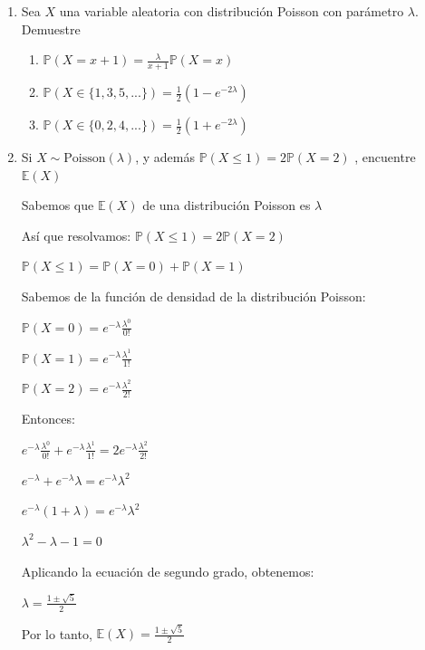 \documentclass[11pt,a4paper]{report}
\begin{document}
\begin{enumerate}
		\item{
		Sea $X$ una variable aleatoria con distribución Poisson con parámetro
		$\lambda$. Demuestre
			\begin{enumerate}
				\item {
					$\mathbb{P}(X = x + 1) = \frac{\lambda}{x + 1}
					 \mathbb{P}(X = x)$
				}

				\item {
					$\mathbb{P}(X \in \{ 1,3,5,...\}) = \frac{1}{2}
					 (1 - e^{-2\lambda})$
				}

				\item {
					$\mathbb{P}(X \in \{ 0,2,4,...\}) = \frac{1}{2}
					 (1 + e^{-2\lambda})$
				}
			\end{enumerate}
		}

		\item{
			Si $X \sim \text{Poisson}(\lambda)$, y además $\mathbb{P}(X \leq 1)
			= 2\mathbb{P}(X = 2)$ , encuentre $\mathbb{E}(X)$
			
			Sabemos que $\mathbb{E}(X)$ de una distribución Poisson es $\lambda$
			
			Así que resolvamos: $\mathbb{P}(X \leq 1) = 2\mathbb{P}(X = 2)$
			
			$\mathbb{P}(X \leq 1) = \mathbb{P}(X = 0) + \mathbb{P}(X = 1)$
			
			Sabemos de la función de densidad de la distribución Poisson:
			
			$\mathbb{P}(X = 0) = e^{-\lambda} \frac{\lambda^{0}}{0!}$
			
			$\mathbb{P}(X = 1) = e^{-\lambda} \frac{\lambda^{1}}{1!}$

			$\mathbb{P}(X = 2) = e^{-\lambda} \frac{\lambda^{2}}{2!}$
			
			Entonces:
			
			$e^{-\lambda} \frac{\lambda^{0}}{0!} + e^{-\lambda} \frac{\lambda^{1}}{1!} = 2 e^{-\lambda} \frac{\lambda^{2}}{2!}$
			
			$e^{-\lambda}  + e^{-\lambda} \lambda =  e^{-\lambda} \lambda^{2}$
			
			$e^{-\lambda} (1 + \lambda) =  e^{-\lambda} \lambda^{2}$
			
			 $\lambda^{2} - \lambda - 1 = 0$
			 
			 Aplicando la ecuación de segundo grado, obtenemos:
			 
			 $\lambda = \frac{1 \pm \sqrt{5}}{2}$
			 
			 Por lo tanto, $ \mathbb{E}(X) = \frac{1 \pm \sqrt{5}}{2}$\\
			
}
\end{enumerate}
\end{document}
